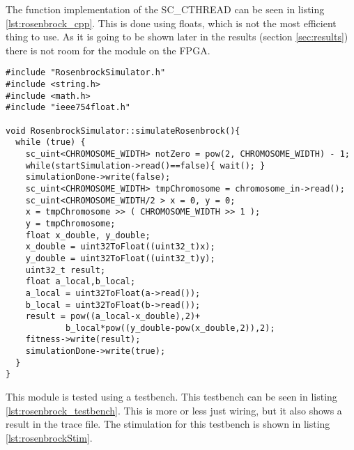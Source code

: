 The function implementation of the SC\_CTHREAD can be seen in listing \ref{lst:rosenbrock_cpp}. This is done using floats, which is not the most efficient thing to use. As it is going to be shown later in the results (section \ref{sec:results}) there is not room for the module on the FPGA. 

\begin{lstlisting}[style=customc++,caption={RosenbrockSimulator.cpp},label={lst:rosenbrock_cpp}]
#include "RosenbrockSimulator.h"
#include <string.h>
#include <math.h>
#include "ieee754float.h"

void RosenbrockSimulator::simulateRosenbrock(){
  while (true) {
    sc_uint<CHROMOSOME_WIDTH> notZero = pow(2, CHROMOSOME_WIDTH) - 1;
    while(startSimulation->read()==false){ wait(); }
    simulationDone->write(false);
    sc_uint<CHROMOSOME_WIDTH> tmpChromosome = chromosome_in->read();
    sc_uint<CHROMOSOME_WIDTH/2 > x = 0, y = 0;
    x = tmpChromosome >> ( CHROMOSOME_WIDTH >> 1 );
    y = tmpChromosome;
    float x_double, y_double;
    x_double = uint32ToFloat((uint32_t)x);
    y_double = uint32ToFloat((uint32_t)y);
    uint32_t result;
    float a_local,b_local;
    a_local = uint32ToFloat(a->read());
    b_local = uint32ToFloat(b->read());
    result = pow((a_local-x_double),2)+
    		b_local*pow((y_double-pow(x_double,2)),2);
    fitness->write(result);
    simulationDone->write(true);
  }
}
\end{lstlisting}

This module is tested using a testbench. This testbench can be seen in listing \ref{lst:rosenbrock_testbench}. This is more or less just wiring, but it also shows a result in the trace file. The stimulation for this testbench is shown in listing \ref{lst:rosenbrockStim}.

